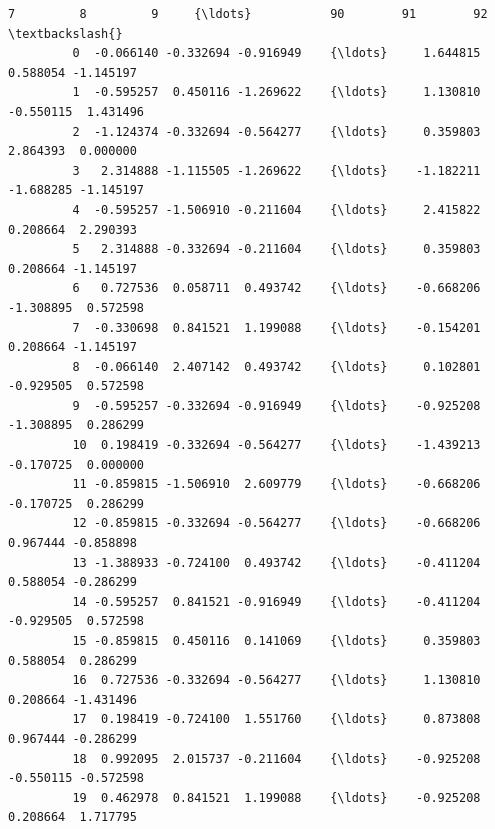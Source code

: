 \documentclass[11pt]{article}
\begin{document}
\begin{Verbatim}[commandchars=\\\{\}]
                   7         8         9     {\ldots}           90        91        92  \textbackslash{}
         0  -0.066140 -0.332694 -0.916949    {\ldots}     1.644815  0.588054 -1.145197   
         1  -0.595257  0.450116 -1.269622    {\ldots}     1.130810 -0.550115  1.431496   
         2  -1.124374 -0.332694 -0.564277    {\ldots}     0.359803  2.864393  0.000000   
         3   2.314888 -1.115505 -1.269622    {\ldots}    -1.182211 -1.688285 -1.145197   
         4  -0.595257 -1.506910 -0.211604    {\ldots}     2.415822  0.208664  2.290393   
         5   2.314888 -0.332694 -0.211604    {\ldots}     0.359803  0.208664 -1.145197   
         6   0.727536  0.058711  0.493742    {\ldots}    -0.668206 -1.308895  0.572598   
         7  -0.330698  0.841521  1.199088    {\ldots}    -0.154201  0.208664 -1.145197   
         8  -0.066140  2.407142  0.493742    {\ldots}     0.102801 -0.929505  0.572598   
         9  -0.595257 -0.332694 -0.916949    {\ldots}    -0.925208 -1.308895  0.286299   
         10  0.198419 -0.332694 -0.564277    {\ldots}    -1.439213 -0.170725  0.000000   
         11 -0.859815 -1.506910  2.609779    {\ldots}    -0.668206 -0.170725  0.286299   
         12 -0.859815 -0.332694 -0.564277    {\ldots}    -0.668206  0.967444 -0.858898   
         13 -1.388933 -0.724100  0.493742    {\ldots}    -0.411204  0.588054 -0.286299   
         14 -0.595257  0.841521 -0.916949    {\ldots}    -0.411204 -0.929505  0.572598   
         15 -0.859815  0.450116  0.141069    {\ldots}     0.359803  0.588054  0.286299   
         16  0.727536 -0.332694 -0.564277    {\ldots}     1.130810  0.208664 -1.431496   
         17  0.198419 -0.724100  1.551760    {\ldots}     0.873808  0.967444 -0.286299   
         18  0.992095  2.015737 -0.211604    {\ldots}    -0.925208 -0.550115 -0.572598   
         19  0.462978  0.841521  1.199088    {\ldots}    -0.925208  0.208664  1.717795   
         

\end{Verbatim}
\end{document}
